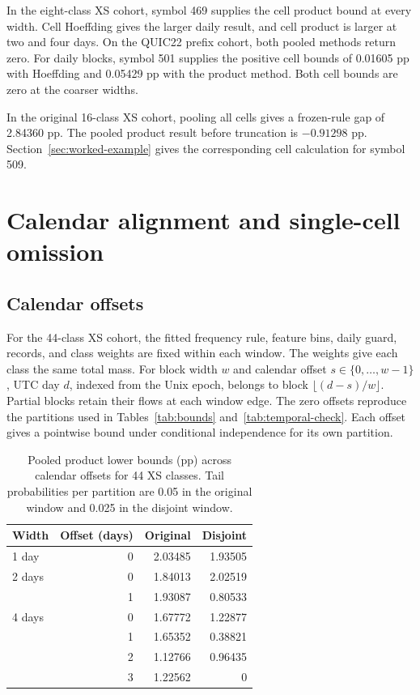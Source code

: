 \documentclass[preprint,11pt]{elsarticle}
\begin{document}
In the eight-class XS cohort, symbol 469 supplies the cell product bound at every width. Cell Hoeffding gives the larger daily result, and cell product is larger at two and four days. On the QUIC22 prefix cohort, both pooled methods return zero. For daily blocks, symbol 501 supplies the positive cell bounds of 0.01605 pp with Hoeffding and 0.05429 pp with the product method. Both cell bounds are zero at the coarser widths.

In the original 16-class XS cohort, pooling all cells gives a frozen-rule gap of 2.84360 pp. The pooled product result before truncation is $-0.91298$ pp. Section~\ref{sec:worked-example} gives the corresponding cell calculation for symbol 509.

\FloatBarrier

\section{Calendar alignment and single-cell omission}
\label{app:alignment-and-omission}

\subsection{Calendar offsets}

For the 44-class XS cohort, the fitted frequency rule, feature bins, daily guard, records, and class weights are fixed within each window. The weights give each class the same total mass. For block width $w$ and calendar offset $s\in\{0,\ldots,w-1\}$, UTC day $d$, indexed from the Unix epoch, belongs to block $\lfloor(d-s)/w\rfloor$. Partial blocks retain their flows at each window edge. The zero offsets reproduce the partitions used in Tables~\ref{tab:bounds} and~\ref{tab:temporal-check}. Each offset gives a pointwise bound under conditional independence for its own partition.

\begin{table}[t]
\centering
\small
\caption{Pooled product lower bounds (pp) across calendar offsets for 44 XS classes. Tail probabilities per partition are 0.05 in the original window and 0.025 in the disjoint window.}
\label{tab:calendar-alignment}
\begin{tabular}{lrrr}
\toprule
Width & Offset (days) & Original & Disjoint \\
\midrule
1 day  & 0 & 2.03485 & 1.93505 \\
2 days & 0 & 1.84013 & 2.02519 \\
       & 1 & 1.93087 & 0.80533 \\
4 days & 0 & 1.67772 & 1.22877 \\
       & 1 & 1.65352 & 0.38821 \\
       & 2 & 1.12766 & 0.96435 \\
       & 3 & 1.22562 & 0 \\
\bottomrule
\end{tabular}
\end{table}
\end{document}
